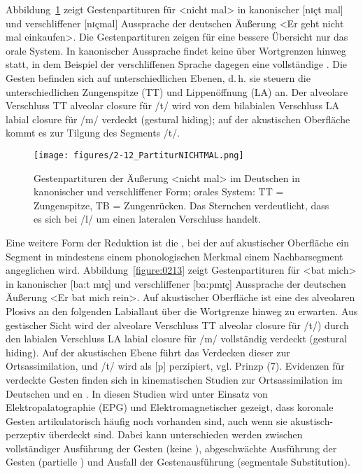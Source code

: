 Abbildung~\ref{figure:0212} zeigt Gestenpartituren für <nicht mal> in kanonischer [nɪçt mal] und verschliffener [nɪçmal] Aussprache der deutschen Äußerung <Er geht nicht mal einkaufen>. Die Gestenpartituren zeigen für eine bessere Übersicht nur das orale System. In kanonischer Aussprache findet keine  über Wortgrenzen hinweg statt, in dem Beispiel der verschliffenen Sprache dagegen eine vollständige . Die Gesten befinden sich auf unterschiedlichen Ebenen, d.\,h. sie steuern die unterschiedlichen  Zungenspitze (TT) und Lippenöffnung (LA) an. Der alveolare Verschluss {TT alveolar closure} für /t/ wird von dem bilabialen Verschluss {LA labial closure} für /m/ verdeckt (gestural hiding); auf der akustischen Oberfläche kommt es zur Tilgung des Segments /t/. 

\begin{figure}[t]
	\texttt{[image: figures/2-12\_PartiturNICHTMAL.png]}
	\caption{Gestenpartituren der Äußerung <nicht mal> im Deutschen in kanonischer und verschliffener Form; orales System: TT = Zungenspitze, TB = Zungenrücken. Das Sternchen verdeutlicht, dass es sich bei /l/ um einen lateralen Verschluss handelt.}
	\label{figure:0212}
\end{figure}

Eine weitere Form der Reduktion ist die , bei der auf akustischer Oberfläche ein Segment in mindestens einem phonologischen Merkmal einem Nachbarsegment angeglichen wird. Abbildung~\ref{figure:0213} zeigt Gestenpartituren für <bat mich> in kanonischer [ba:t mɪç] und verschliffener [ba:pmɪç] Aussprache der deutschen Äußerung <Er bat mich rein>. Auf akustischer Oberfläche ist eine  des alveolaren Plosivs an den folgenden Labiallaut über die Wortgrenze hinweg zu erwarten. Aus gestischer Sicht wird der alveolare Verschluss {TT alveolar closure} für /t/) durch den labialen Verschluss {LA labial closure} für /m/ vollständig verdeckt (gestural hiding). Auf der akustischen Ebene führt das Verdecken dieser  zur Ortsassimilation, und /t/ wird als [p] perzipiert, vgl. Prinzp (7). Evidenzen für verdeckte Gesten finden sich in kinematischen Studien zur Ortsassimilation im Deutschen \citep{Kohler1995, Jaeger2007, Bergmann2008, Mücke2008c} und en \citep{Barry1991, Ellis2002}. In diesen Studien wird unter Einsatz von Elektropalatographie (EPG) und Elektromagnetischer  gezeigt, dass koronale Gesten artikulatorisch häufig noch vorhanden sind, auch wenn sie akustisch-perzeptiv überdeckt sind. Dabei kann unterschieden werden zwischen vollständiger Ausführung der Gesten (keine ), abgeschwächte Ausführung der Gesten (partielle ) und Ausfall der Gestenausführung (segmentale Substitution).

